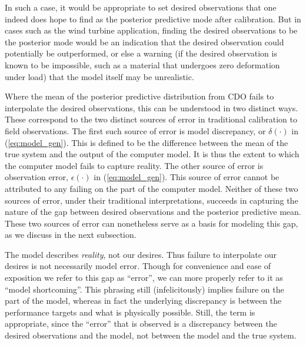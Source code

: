 \documentclass{article}
\begin{document}
In such a case, it would be appropriate to set desired observations that one indeed does hope to find as the posterior predictive mode after calibration. 
%
But in cases such as the wind turbine application, finding the desired observations to be the posterior mode would be an indication that the desired observation could potentially be outperformed, or else a warning (if the desired observation is known to be impossible, such as a material that undergoes zero deformation under load) that the model itself may be unrealistic. 
%

Where the mean of the posterior predictive distribution from CDO fails to interpolate the desired observations, this can be understood in two distinct ways. 
%
These correspond to the two distinct sources of error in traditional calibration to field observations. 
%
The first such source of error is model discrepancy, or $\delta(\cdot)$ in (\ref{eq:model_gen}). 
%
This is defined to be the difference between the mean of the true system and the output of the computer model.
%
It is thus the extent to which the computer model fails to capture reality. 
%
The other source of error is observation error, $\epsilon(\cdot)$ in (\ref{eq:model_gen}). 
%
%
This source of error cannot be attributed to any failing on the part of the computer model. 
%
Neither of these two sources of error, under their traditional interpretations, succeeds in capturing the nature of the gap between desired observations and the posterior predictive mean. 
%
These two sources of error can nonetheless serve as a basis for modeling this gap, as we discuss in the next subsection.
%

%
The model  describes \emph{reality}, not our desires. 
Thus failure to interpolate our desires is not necessarily model error. 
%
Though for convenience and ease of exposition we refer to this gap as ``error'', we can more properly refer to it as ``model shortcoming''. 
%
This phrasing still (infelicitously) implies failure on the part of the model, whereas in fact the underlying discrepancy is between the performance targets and what is physically possible.
%
%
%
Still, the term is appropriate, since the ``error'' that is observed is a discrepancy between the desired observations and the model, not between the model and the true system.
\end{document}
